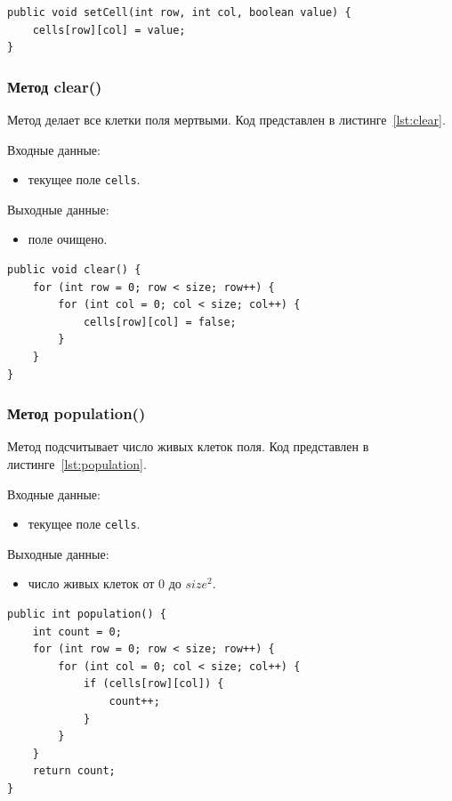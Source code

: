 \begin{lstlisting}[caption={Метод setCell()}, label={lst:setcell}]
public void setCell(int row, int col, boolean value) {
	cells[row][col] = value;
}
\end{lstlisting}

\subsubsection*{Метод clear()}

Метод делает все клетки поля мертвыми. Код представлен в листинге~\ref{lst:clear}.

Входные данные:
\begin{itemize}
	\item текущее поле \texttt{cells}.
\end{itemize}

Выходные данные:
\begin{itemize}
	\item поле очищено.
\end{itemize}

\begin{lstlisting}[caption={Метод clear()}, label={lst:clear}]
public void clear() {
	for (int row = 0; row < size; row++) {
		for (int col = 0; col < size; col++) {
			cells[row][col] = false;
		}
	}
}
\end{lstlisting}

\subsubsection*{Метод population()}

Метод подсчитывает число живых клеток поля. Код представлен в листинге~\ref{lst:population}.

Входные данные:
\begin{itemize}
	\item текущее поле \texttt{cells}.
\end{itemize}

Выходные данные:
\begin{itemize}
	\item число живых клеток от 0 до $size^2$.
\end{itemize}

\begin{lstlisting}[caption={Метод population()}, label={lst:population}]
public int population() {
	int count = 0;
	for (int row = 0; row < size; row++) {
		for (int col = 0; col < size; col++) {
			if (cells[row][col]) {
				count++;
			}
		}
	}
	return count;
}
\end{lstlisting}

